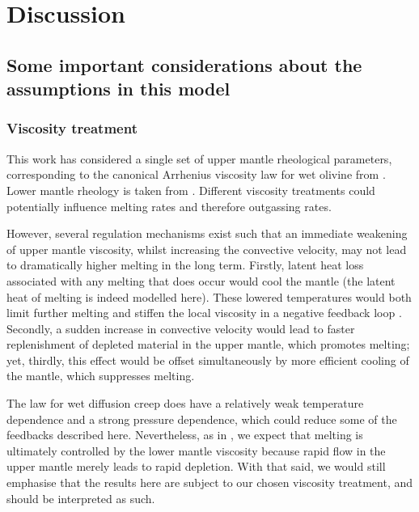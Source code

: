 

\section{Discussion}

\subsection{Some important considerations about the assumptions in this model}

\subsubsection{Viscosity treatment}

This work has considered a single set of upper mantle rheological parameters, corresponding to the canonical Arrhenius viscosity law for wet olivine from \citet{karato_rheology_1993}. Lower mantle rheology is taken from \citet{tackley_mantle_2013}.  Different viscosity treatments could potentially influence melting rates and therefore outgassing rates.

However, several regulation mechanisms exist such that an immediate weakening of upper mantle viscosity, whilst increasing the convective velocity, may not lead to dramatically higher melting in the long term. Firstly, latent heat loss associated with any melting that does occur would cool the mantle (the latent heat of melting is indeed modelled here). These lowered temperatures would both limit further melting and stiffen the local viscosity in a negative feedback loop \citep{Ogawa2011}. Secondly, a sudden increase in convective velocity would lead to faster replenishment of depleted material in the upper mantle, which promotes melting; yet, thirdly, this effect would be offset simultaneously by more efficient cooling of the mantle, which suppresses melting.

The \citet{karato_rheology_1993} law for wet diffusion creep does have a relatively weak temperature dependence and a strong pressure dependence, which could reduce some of the feedbacks described here. Nevertheless, as in \citet{dorn_outgassing_2018}, we expect that melting is ultimately controlled by the lower mantle viscosity because rapid flow in the upper mantle merely leads to rapid depletion. With that said, we would still emphasise that the results here are subject to our chosen viscosity treatment, and should be interpreted as such.



